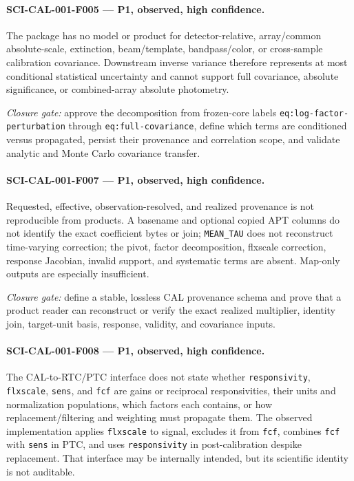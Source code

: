 \documentclass[11pt]{article}
\newcommand{\code}[1]{\nolinkurl{#1}}
\begin{document}
\paragraph{SCI-CAL-001-F005 --- P1, observed, high confidence.}
The package has no model or product for detector-relative, array/common
absolute-scale, extinction, beam/template, bandpass/color, or cross-sample
calibration covariance.  Downstream inverse variance therefore represents at
most conditional statistical uncertainty and cannot support full covariance,
absolute significance, or combined-array absolute photometry.

\emph{Closure gate:} approve the decomposition from frozen-core labels
\code{eq:log-factor-perturbation} through \code{eq:full-covariance}, define
which terms are conditioned versus propagated, persist their provenance and
correlation scope, and validate analytic and Monte Carlo covariance transfer.

\paragraph{SCI-CAL-001-F007 --- P1, observed, high confidence.}
Requested, effective, observation-resolved, and realized provenance is not
reproducible from products.  A basename and optional copied APT columns do not
identify the exact coefficient bytes or join; \code{MEAN_TAU} does not
reconstruct time-varying correction; the pivot, factor decomposition,
flxscale correction, response Jacobian, invalid support, and systematic terms
are absent.  Map-only outputs are especially insufficient.

\emph{Closure gate:} define a stable, lossless CAL provenance schema and prove
that a product reader can reconstruct or verify the exact realized multiplier,
identity join, target-unit basis, response, validity, and covariance inputs.

\paragraph{SCI-CAL-001-F008 --- P1, observed, high confidence.}
The CAL-to-RTC/PTC interface does not state whether \code{responsivity},
\code{flxscale}, \code{sens}, and \code{fcf} are gains or reciprocal
responsivities, their units and normalization populations, which factors each
contains, or how replacement/filtering and weighting must propagate them.
The observed implementation applies \code{flxscale} to signal, excludes it
from \code{fcf}, combines \code{fcf} with \code{sens} in PTC, and uses
\code{responsivity} in post-calibration despike replacement.  That interface
may be internally intended, but its scientific identity is not auditable.
\end{document}

